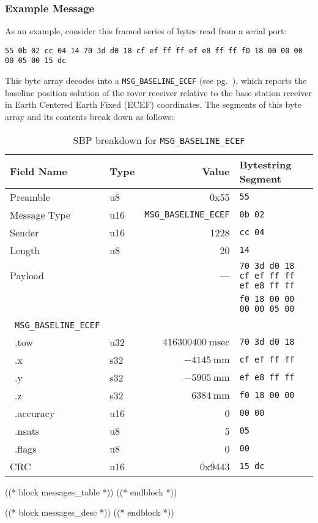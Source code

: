 \documentclass[9pt]{extarticle}
\numberwithin{table}{subsection}
\numberwithin{field}{subsection}
\begin{document}
\subsubsection*{Example Message}
\begin{large}
 \par As an example, consider this framed series of bytes read from a
 serial port:
\begin{verbatim}
55 0b 02 cc 04 14 70 3d d0 18 cf ef ff ff ef e8 ff ff f0 18 00 00 00 00 05 00 15 dc
\end{verbatim}
This byte array decodes into a \texttt{MSG\_BASELINE\_ECEF} (see
pg.~\pageref{sec:MSG_BASELINE_ECEF}), which reports the baseline position
solution of the rover receiver relative to the base station receiver
in Earth Centered Earth Fixed (ECEF) coordinates. The segments of this
byte array and its contents break down as follows:
\end{large}
\begin{table}[h]
  \centering
  \begin{tabular}{llrl}
    \toprule
    Field Name & Type & Value & Bytestring Segment\\
    \midrule
    {Preamble} & u8 & 0x55 & \verb!55! \\
    {Message Type}& u16 & \texttt{MSG\_BASELINE\_ECEF} & \verb!0b 02! \\
    {Sender}& u16 & 1228 & \verb!cc 04! \\
    {Length}& u8 & 20 &  \verb!14! \\
    {Payload}& & --- & \verb!70 3d d0 18 cf ef ff ff ef e8 ff ff! \\
    & & & \verb!f0 18 00 00 00 00 05 00! \\
    \quad~\texttt{MSG\_BASELINE\_ECEF} & & & \\
    \quad~.tow & u32 & $416300400~\textrm{msec}$  & \verb!70 3d d0 18! \\
    \quad~.x & s32 & $-4145~\textrm{mm}$  & \verb!cf ef ff ff! \\
    \quad~.y & s32 & $-5905~\textrm{mm}$  & \verb!ef e8 ff ff! \\
    \quad~.z & s32 & $6384~\textrm{mm}$  & \verb!f0 18 00 00! \\
    \quad~.accuracy & u16 & 0 & \verb!00 00! \\
    \quad~.nsats & u8 & 5 & \verb!05! \\
    \quad~.flags & u8 & 0 & \verb!00! \\
    {CRC} & u16 & 0x9443 & \verb!15 dc! \\
    \bottomrule
  \end{tabular}
  \caption{SBP breakdown for \texttt{MSG\_BASELINE\_ECEF}}
  \label{tab:example_breakdown}
\end{table}

((* block messages_table *))
((* endblock *))

((* block messages_desc *))
((* endblock *))
\end{document}
